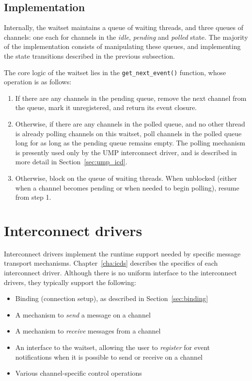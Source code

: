 \documentclass[a4paper,twoside]{report} %
\begin{document}
\subsection{Implementation}

Internally, the waitset maintains a queue of waiting threads, and three queues
of channels: one each for channels in the \emph{idle}, \emph{pending} and
\emph{polled} state. The majority of the implementation consists of manipulating
these queues, and implementing the state transitions described in the previous
subsection.

The core logic of the waitset lies in the \lstinline+get_next_event()+
function, whose operation is as follows:

\begin{enumerate}
 \item If there are any channels in the pending queue, remove the next channel
   from the queue, mark it unregistered, and return its event closure.
 \item Otherwise, if there are any channels in the polled queue, and no other
   thread is already polling channels on this waitset, poll channels in the
   polled queue long for as long as the pending queue remains empty. The
   polling mechanism is presently used only by the UMP interconnect driver,
   and is described in more detail in Section~\ref{sec:ump_icd}.
 \item Otherwise, block on the queue of waiting threads. When unblocked
   (either when a channel becomes pending or when needed to begin polling),
   resume from step 1.
\end{enumerate}

\section{Interconnect drivers}
\label{sec:icds}

Interconnect drivers implement the runtime support needed by specific
message transport mechanisms. Chapter~\ref{cha:icds} describes the specifics
of each interconnect driver. Although there is no uniform interface to the
interconnect drivers, they typically support the following:

\begin{itemize}
 \item Binding (connection setup), as described in Section~\ref{sec:binding}
 \item A mechanism to \emph{send} a message on a channel
 \item A mechanism to \emph{receive} messages from a channel
 \item An interface to the waitset, allowing the user to \emph{register} for
       event notifications when it is possible to send or receive on a channel
 \item Various channel-specific control operations
\end{itemize}
\end{document}
